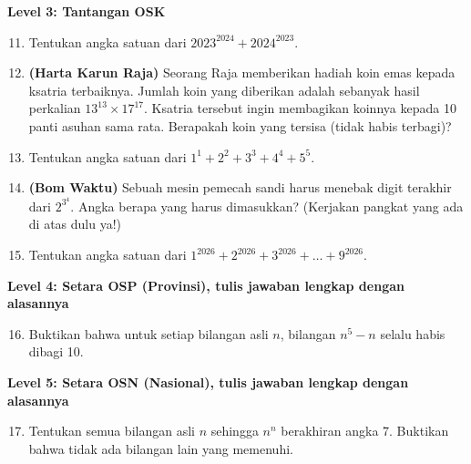 \documentclass[11pt,a4paper]{article}
\newcommand{\level}[1]{\par\medskip\noindent\colorbox{black!12}{\strut\textbf{#1}}\par\smallskip}
\begin{document}
\level{Level 3: Tantangan OSK}
\begin{enumerate}
    \setcounter{enumi}{10}
    \item Tentukan angka satuan dari $2023^{2024} + 2024^{2023}$.
    \item \textbf{(Harta Karun Raja)} Seorang Raja memberikan hadiah koin emas kepada ksatria
          terbaiknya. Jumlah koin yang diberikan adalah sebanyak hasil perkalian
          $13^{13} \times 17^{17}$. Ksatria tersebut ingin membagikan koinnya kepada 10 panti
          asuhan sama rata. Berapakah koin yang tersisa (tidak habis terbagi)?
    \item Tentukan angka satuan dari $1^1 + 2^2 + 3^3 + 4^4 + 5^5$.
    \item \textbf{(Bom Waktu)} Sebuah mesin pemecah sandi harus menebak digit terakhir dari
          $2^{3^4}$. Angka berapa yang harus dimasukkan? (Kerjakan pangkat yang ada di atas dulu ya!)
    \item Tentukan angka satuan dari $1^{2026} + 2^{2026} + 3^{2026} + \dots + 9^{2026}$.
\end{enumerate}

\level{Level 4: Setara OSP (Provinsi), tulis jawaban lengkap dengan alasannya}
\begin{enumerate}
    \setcounter{enumi}{15}
    \item Buktikan bahwa untuk setiap bilangan asli $n$, bilangan $n^5 - n$ selalu habis
          dibagi 10.
\end{enumerate}

\level{Level 5: Setara OSN (Nasional), tulis jawaban lengkap dengan alasannya}
\begin{enumerate}
    \setcounter{enumi}{16}
    \item Tentukan semua bilangan asli $n$ sehingga $n^n$ berakhiran angka 7.
          Buktikan bahwa tidak ada bilangan lain yang memenuhi.
\end{enumerate}
\end{document}

